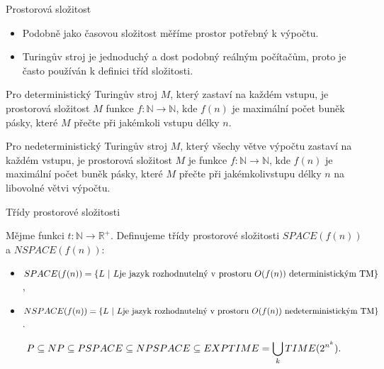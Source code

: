         
        \begin{frame}{Prostorová složitost}
        \begin{itemize}
            \item Podobně jako časovou složitost měříme prostor potřebný k výpočtu.
            \item Turingův stroj je jednoduchý a dost podobný reálným počítačům, proto je často používán k definici tříd složitosti.
        \end{itemize}
        \begin{definition}
        Pro deterministický Turingův stroj $M$, který zastaví na každém vstupu, je
        \alert{prostorová složitost} $M$ funkce $f:\mathbb{N}\to \mathbb{N}$, kde $f(n)$ je maximální počet buněk pásky, které  $M$ přečte při jakémkoli vstupu délky $n$.
        
        
        Pro nedeterministický Turingův stroj $M$, který všechy větve výpočtu zastaví na každém vstupu, je 
        \alert{prostorová složitost} $M$ je funkce $f:\mathbb{N}\to \mathbb{N}$, kde $f(n)$ je maximální počet buněk pásky, které  $M$ přečte při jakémkolivstupu délky $n$ na libovolné větvi výpočtu.
        
        \end{definition}
        \end{frame}
        
        \begin{frame}{Třídy prostorové složitosti}
        \begin{definition}
        Mějme funkci $t: \mathbb{N}\to \mathbb{R}^+$. Definujeme \alert{třídy prostorové složitosti } $SPACE(f(n))$ a $NSPACE(f(n))$: %
        \begin{itemize}
            \item $SPACE(f(n))=\{L \ |\  L \hbox{je jazyk rozhodnutelný v prostoru $O(f(n))$ deterministickým TM}\}$,
            \item $NSPACE(f(n))=\{L \ |\  L \hbox{je jazyk rozhodnutelný v prostoru $O(f(n))$ nedeterministickým TM}\}$.
        \end{itemize}
        \end{definition}
        
        \begin{theorem}
        $$P \subseteq NP \subseteq PSPACE \subseteq NPSPACE \subseteq EXPTIME = \bigcup_k TIME(2^{n^k})\hbox{.} $$
        \end{theorem}
        
        \end{frame}